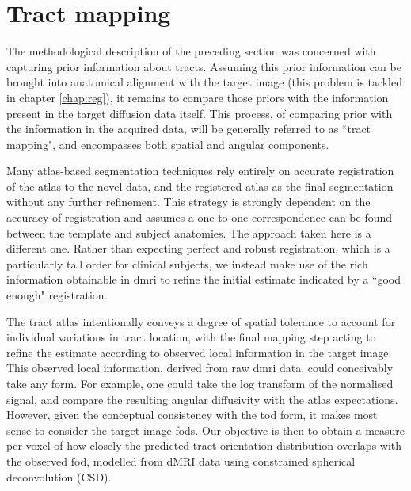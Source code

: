 \section{Tract mapping}
\label{chapterlabel4}


The methodological description of the preceding section was concerned with capturing prior information about tracts.
Assuming this prior information can be brought into anatomical alignment with the target image (this problem is tackled in chapter \ref{chap:reg}), it remains to compare those priors with the information present in the target diffusion data itself.
This process, of comparing prior with the information in the acquired data, will be generally referred to as ``tract mapping", and encompasses both spatial and angular components.

Many atlas-based segmentation techniques rely entirely on accurate registration of the atlas to the novel data, and  the registered atlas as the final segmentation without any further refinement.
This strategy is strongly dependent on the accuracy of registration and assumes a one-to-one correspondence can be found  between the template and subject anatomies.
The approach taken here is a different one.
Rather than expecting perfect and robust registration, which is a particularly tall order for clinical subjects, we instead make use of the rich information obtainable in \gls{dmri} to refine the initial estimate indicated by a ``good enough" registration.

The tract atlas intentionally conveys a degree of spatial tolerance to account for individual variations in tract location, with the final mapping step acting to refine the estimate according to observed local information in the target image.
This observed local information, derived from raw \gls{dmri} data, could conceivably take any form.
For example, one could take the log transform of the normalised signal, and compare the resulting angular diffusivity with the atlas expectations. 
However, given the conceptual consistency with the \gls{tod} form, it makes most sense to consider the target image \glspl{fod}.
Our objective is then to obtain a measure per voxel of how closely the predicted tract orientation distribution overlaps with the observed \gls{fod}, modelled from dMRI data using constrained spherical deconvolution (CSD). \autocite{Tournier2007} 

